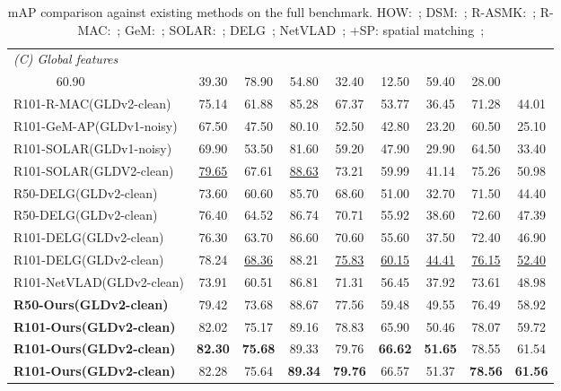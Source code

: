 \documentclass[letterpaper]{article} \usepackage{aaai22}  \usepackage{times}  \usepackage{helvet}  \usepackage{courier}  \usepackage[hyphens]{url}  \usepackage{graphicx} \urlstyle{rm} \def\UrlFont{\rm}  \usepackage{natbib}  \usepackage{caption} \DeclareCaptionStyle{ruled}{labelfont=normalfont,labelsep=colon,strut=off} \frenchspacing  \setlength{\pdfpagewidth}{8.5in}  \setlength{\pdfpageheight}{11in}  \usepackage{algorithm}
\begin{document}
\begin{table*}[h]
\begin{center}
{\begin{tabular}{llcccccccc}
				\multicolumn{10}{l}{\textsl{(C) Global features} } \\ \hdashline
				\multicolumn{2}{l}{R101-R-MAC(NC-clean)}&60.90  &39.30 & 78.90&54.80 &32.40 &12.50 &59.40 &28.00 \\ 
				\multicolumn{2}{l}{R101-R-MAC(GLDv2-clean)}&75.14  &61.88 & 85.28&67.37 &53.77 &36.45 &71.28 &44.01 \\
				\multicolumn{2}{l}{R101-GeM-AP(GLDv1-noisy)}& 67.50  &47.50 &80.10 &52.50 &42.80 &23.20 &60.50 &25.10 \\ 
				\multicolumn{2}{l}{R101-SOLAR(GLDv1-noisy)}&69.90  & 53.50 &81.60 &59.20 & 47.90 &29.90 & 64.50 & 33.40 \\ 
				\multicolumn{2}{l}{R101-SOLAR(GLDV2-clean)}&\underline{79.65}  & 67.61 & \underline{88.63} &73.21 & 59.99 &41.14 & 75.26 & 50.98 \\ 
				\multicolumn{2}{l}{R50-DELG(GLDv2-clean)}&73.60  &60.60 &85.70 &68.60 &51.00 &32.70 &71.50 &44.40 \\ 
				\multicolumn{2}{l}{R50-DELG(GLDv2-clean)}&76.40  &64.52 &86.74 &70.71 &55.92 &38.60  &72.60 &47.39  \\
				\multicolumn{2}{l}{R101-DELG(GLDv2-clean)}&76.30  &63.70 &86.60 &70.60 &55.60 &37.50 &72.40 &46.90 \\ 
				\multicolumn{2}{l}{R101-DELG(GLDv2-clean)}&78.24  &\underline{68.36} &88.21 &\underline{75.83} &\underline{60.15} &\underline{44.41} &\underline{76.15} &\underline{52.40} \\ 
				\multicolumn{2}{l}{R101-NetVLAD(GLDv2-clean)}&73.91  &60.51 &86.81 &71.31 &56.45 &37.92 &73.61 &48.98 \\ 
				\toprule
				\multicolumn{2}{l}{\textbf{R50-Ours(GLDv2-clean)}} & 79.42 & 73.68 & 88.67 & 77.56 & 59.48 & 49.55 & 76.49 & 58.92\\
				\multicolumn{2}{l}{\textbf{R101-Ours(GLDv2-clean)}} & 82.02 & 75.17 & 89.16 & 78.83 & 65.90 & 50.46 & 78.07 & 59.72 \\
				\multicolumn{2}{l}{\textbf{R101-Ours(GLDv2-clean)}} & \textbf{82.30} & \textbf{75.68} & 89.33 & 79.76 & \textbf{66.62} & \textbf{51.65} & 78.55 & 61.54 \\
				\multicolumn{2}{l}{\textbf{R101-Ours(GLDv2-clean)}} &  82.28 & 75.64 & \textbf{89.34} & \textbf{79.76} & 66.57 & 51.37 & \textbf{78.56} & \textbf{61.56}\\
				\toprule
			\end{tabular}
		}	
	\end{center}
	\caption{mAP comparison against existing methods on the full benchmark. HOW:~\cite{tolias2020learning}; DSM:~\cite{Simeoni_2019_CVPR}; R-ASMK:~\cite{teichmann2019detect}; R-MAC:~\cite{tolias:hal-01842218}; GeM:~\cite{radenovic2018fine}; SOLAR:~\cite{ng2020solar}; DELG~\cite{cao2020unifying}; NetVLAD~\cite{arandjelovic2016netvlad}; +SP: spatial matching~\cite{philbin2007object}; 
}
\end{table*}
\end{document}
